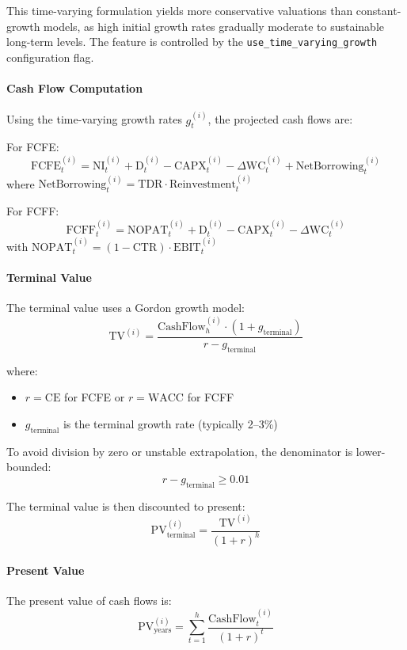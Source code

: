 This time-varying formulation yields more conservative valuations than constant-growth models, as high initial growth rates gradually moderate to sustainable long-term levels. The feature is controlled by the \texttt{use\_time\_varying\_growth} configuration flag.

\paragraph{Cash Flow Computation}

Using the time-varying growth rates $g_t^{(i)}$, the projected cash flows are:

For FCFE:
\[
\text{FCFE}_t^{(i)} = \text{NI}_t^{(i)} + \text{D}_t^{(i)} - \text{CAPX}_t^{(i)} - \Delta \text{WC}_t^{(i)} + \text{NetBorrowing}_t^{(i)}
\]
where $\text{NetBorrowing}_t^{(i)} = \text{TDR} \cdot \text{Reinvestment}_t^{(i)}$

For FCFF:
\[
\text{FCFF}_t^{(i)} = \text{NOPAT}_t^{(i)} + \text{D}_t^{(i)} - \text{CAPX}_t^{(i)} - \Delta \text{WC}_t^{(i)}
\]
with $\text{NOPAT}_t^{(i)} = (1 - \text{CTR}) \cdot \text{EBIT}_t^{(i)}$

\paragraph{Terminal Value}

The terminal value uses a Gordon growth model:
\[
\text{TV}^{(i)} = \frac{\text{CashFlow}_h^{(i)} \cdot (1 + g_{\text{terminal}})}{r - g_{\text{terminal}}}
\]

where:
\begin{itemize}
  \item $r = \text{CE}$ for FCFE or $r = \text{WACC}$ for FCFF
  \item $g_{\text{terminal}}$ is the terminal growth rate (typically 2--3\%)
\end{itemize}

To avoid division by zero or unstable extrapolation, the denominator is lower-bounded:
\[
r - g_{\text{terminal}} \geq 0.01
\]

The terminal value is then discounted to present:
\[
\text{PV}_{\text{terminal}}^{(i)} = \frac{\text{TV}^{(i)}}{(1 + r)^h}
\]

\paragraph{Present Value}

The present value of cash flows is:
\[
\text{PV}_{\text{years}}^{(i)} = \sum_{t=1}^h \frac{\text{CashFlow}_t^{(i)}}{(1 + r)^t}
\]

